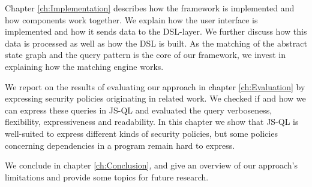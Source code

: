 Chapter \ref{ch:Implementation} describes how the framework is implemented and how components work together. We explain how the user interface is implemented and how it sends data to the DSL-layer. We further discuss how this data is processed as well as how the DSL is built. As the matching of the abstract state graph and the query pattern is the core of our framework, we invest in explaining how the matching engine works.

We report on the results of evaluating our approach in chapter \ref{ch:Evaluation} by expressing security policies originating in related work. We checked if and how we can express these queries in JS-QL and evaluated the query verboseness, flexibility, expressiveness and readability. In this chapter we show that JS-QL is well-suited to express different kinds of security policies, but some policies concerning dependencies in a program remain hard to express. 

We conclude in chapter \ref{ch:Conclusion}, and give an overview of our approach's limitations and provide some topics for future research.